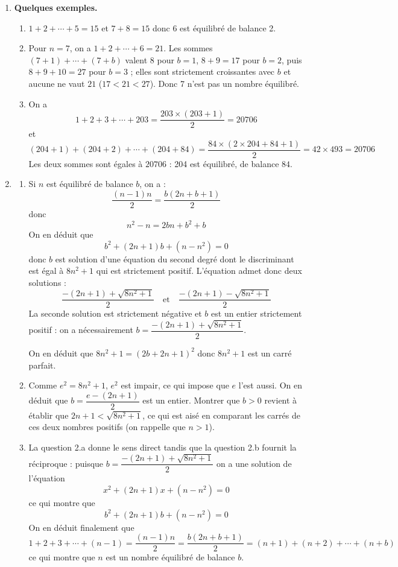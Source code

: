 \begin{enumerate}
\item \textbf{Quelques exemples.}
\begin{enumerate}
    \item $1 + 2 + \cdots + 5 = 15$ et $7 + 8 = 15$ donc 6 est équilibré de balance 2.
    
    \item Pour $n = 7$, on a $1 + 2 + \cdots + 6 = 21$. Les sommes $(7+1) + \cdots + (7+b)$ valent $8$ pour $b = 1$, $8 + 9 = 17$ pour $b = 2$, puis $8 + 9 + 10 = 27$ pour $b = 3$ ; elles sont strictement croissantes avec $b$ et aucune ne vaut $21$ ($17 < 21 < 27$). Donc 7 n'est pas un nombre équilibré.
    
    \item On a
    \[1 + 2 + 3 + \cdots + 203 = \frac{203 \times (203 + 1)}{2} = 20706\]
    et
    \[(204 + 1) + (204 + 2) + \cdots + (204 + 84) = \frac{84 \times (2 \times 204 + 84 + 1)}{2} = 42 \times 493 = 20706\]
    Les deux sommes sont égales à $20706$ : 204 est équilibré, de balance $84$.
\end{enumerate}

\item \textbf{}
\begin{enumerate}
    \item Si $n$ est équilibré de balance $b$, on a :
    \[\frac{(n - 1)n}{2} = \frac{b(2n + b + 1)}{2}\]
    donc
    \[n^2 - n = 2bn + b^2 + b\]
    On en déduit que
    \[b^2 + (2n + 1)b + (n - n^2) = 0\]
    donc $b$ est solution d'une équation du second degré dont le discriminant est égal à $8n^2 + 1$ qui est strictement positif. L'équation admet donc deux solutions :
    \[\frac{-(2n + 1) + \sqrt{8n^2 + 1}}{2} \quad \text{et} \quad \frac{-(2n + 1) - \sqrt{8n^2 + 1}}{2}\]
    La seconde solution est strictement négative et $b$ est un entier strictement positif : on a nécessairement $b = \dfrac{-(2n+1)+\sqrt{8n^2+1}}{2}$.
    
    On en déduit que $8n^2 + 1 = (2b + 2n + 1)^2$ donc $8n^2 + 1$ est un carré parfait.
    
    \item Comme $e^2 = 8n^2 + 1$, $e^2$ est impair, ce qui impose que $e$ l'est aussi. On en déduit que $b = \dfrac{e - (2n + 1)}{2}$ est un entier. Montrer que $b > 0$ revient à établir que $2n + 1 < \sqrt{8n^2 + 1}$, ce qui est aisé en comparant les carrés de ces deux nombres positifs (on rappelle que $n > 1$).
    
    \item La question 2.a donne le sens direct tandis que la question 2.b fournit la réciproque : puisque $b = \dfrac{-(2n+1)+\sqrt{8n^2+1}}{2}$ on a une solution de l'équation
    \[x^2 + (2n + 1)x + (n - n^2) = 0\]
    ce qui montre que
    \[b^2 + (2n + 1)b + (n - n^2) = 0\]
    On en déduit finalement que
    \[1 + 2 + 3 + \cdots + (n - 1) = \frac{(n - 1)n}{2} = \frac{b(2n + b + 1)}{2} = (n + 1) + (n + 2) + \cdots + (n + b)\]
    ce qui montre que $n$ est un nombre équilibré de balance $b$.
\end{enumerate}


\end{enumerate}

